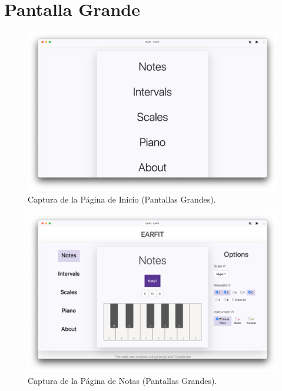 \documentclass[12pt,twoside,titlepage]{report}
\begin{document}
{\section{Pantalla Grande}

\begin{figure}[H]
    \centering
    \includegraphics[scale=0.28]{Capturas Earfit/PC/Menu}
    \caption{Captura de la Página de Inicio (Pantallas Grandes).}
    \label{fig:PCMenu}
\end{figure}

\begin{figure}[H]
    \centering
    \includegraphics[scale=0.28]{Capturas Earfit/PC/Notes}
    \caption{Captura de la Página de Notas (Pantallas Grandes).}
    \label{fig:PCNotes}
\end{figure}

}
\end{document}
